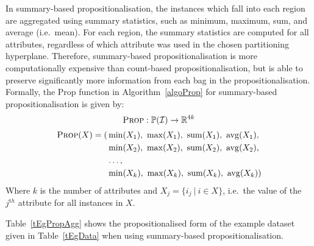 \documentclass[a4paper,12pt]{report} %
\newcommand{\real}{\mathbb{R}}
\newcommand{\mcl}[1]{\mathcal{#1}}
\newcommand{\power}{\mathbb{P}}
\DeclareMathOperator{\avg}{avg}
\DeclareMathOperator{\tsum}{sum}
\begin{document}
In summary-based propositionalisation, 
    the instances which fall into each region  
    are aggregated using summary statistics, such as
    minimum, maximum, sum, and average (i.e.\ mean).
For each region, the summary statistics are computed 
    for all attributes, regardless of which attribute was 
    used in the chosen partitioning hyperplane.
Therefore, summary-based propositionalisation is more
    computationally expensive than count-based propositionalisation, 
    but is able to preserve significantly more information from each bag 
    in the propositionalisation.
Formally, the {\sc Prop} function in Algorithm~\ref{algoProp} 
    for summary-based propositionalisation is given by:
$$ \textrm{\sc Prop}:\power(\mcl{I}) \to \real^{4k}  $$
\begin{align*}
    \textrm{\sc Prop}(X) = (
        &\min(X_1),~\max(X_1),~\tsum(X_1),~\avg(X_1), \\
        &\min(X_2),~\max(X_2),~\tsum(X_2),~\avg(X_2), \\
        &\ldots, \\
        &\min(X_k),~\max(X_k),~\tsum(X_k),~\avg(X_k))
\end{align*}
Where $k$ is the number of attributes and $X_j = \{ i_j ~|~ i \in X \}$, i.e.\ 
    the value of the $j^{\mathrm th}$ attribute for all instances in $X$.
    
Table~\ref{tEgPropAgg} shows the propositionalised form of 
    the example dataset given in Table~\ref{tEgData} when
    using summary-based propositionalisation.   
    
\end{document}

